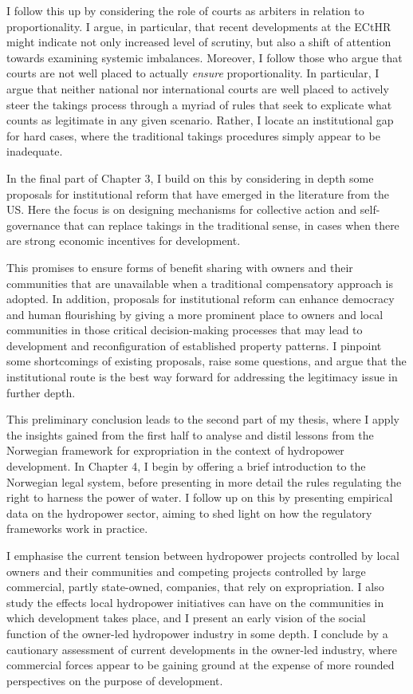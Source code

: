 \documentclass{book} %
\begin{document}
I follow this up by considering the role of courts as arbiters in relation to proportionality. I argue, in particular, that recent developments at the ECtHR might indicate not only increased level of scrutiny, but also a shift of attention towards examining systemic imbalances. Moreover, I follow those who argue that courts are not well placed to actually {\it ensure} proportionality. In particular, I argue that neither national nor international courts are well placed to actively steer the takings process through a myriad of rules that seek to explicate what counts as legitimate in any given scenario. Rather, I locate an institutional gap for hard cases, where the traditional takings procedures simply appear to be inadequate.

In the final part of Chapter 3, I build on this by considering in depth some proposals for institutional reform that have emerged in the literature from the US. Here the focus is on designing mechanisms for collective action and self-governance that can replace takings in the traditional sense, in cases when there are strong economic incentives for development. 

This promises to ensure forms of benefit sharing with owners and their communities that are unavailable when a traditional compensatory approach is adopted. In addition, proposals for institutional reform can enhance democracy and human flourishing by giving a more prominent place to owners and local communities in those critical decision-making processes that may lead to development and reconfiguration of established property patterns. I pinpoint some shortcomings of existing proposals, raise some questions, and argue that the institutional route is the best way forward for addressing the legitimacy issue in further depth.

This preliminary conclusion leads to the second part of my thesis, where I apply the insights gained from the first half to analyse and distil lessons from the Norwegian framework for expropriation in the context of hydropower development. In Chapter 4, I begin by offering a brief introduction to the Norwegian legal system, before presenting in more detail the rules regulating the right to harness the power of water. I follow up on this by presenting empirical data on the hydropower sector, aiming to shed light on how the regulatory frameworks work in practice. 

I emphasise the current tension between hydropower projects controlled by local owners and their communities and competing projects controlled by large commercial, partly state-owned, companies, that rely on expropriation. I also study the effects local hydropower initiatives can have on the communities in which development takes place, and I present an early vision of the social function of the owner-led hydropower industry in some depth. I conclude by a cautionary assessment of current developments in the owner-led industry, where commercial forces appear to be gaining ground at the expense of more rounded perspectives on the purpose of development.
\end{document}
